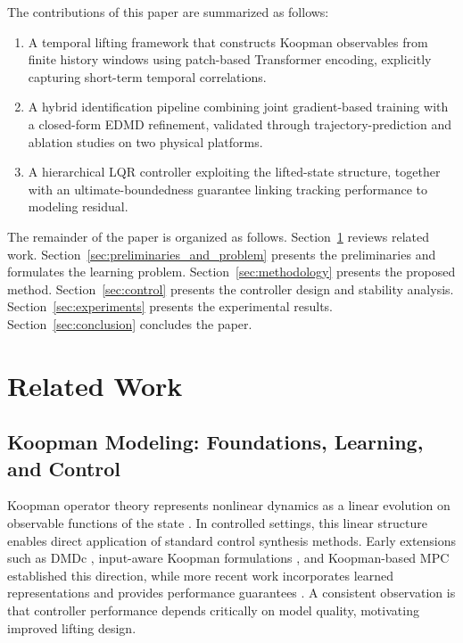 \documentclass[journal]{IEEEtran}
\begin{document}
The contributions of this paper are summarized as follows:
\begin{enumerate}
    \item A temporal lifting framework that constructs Koopman observables from finite history windows using patch-based Transformer encoding, explicitly capturing short-term temporal correlations.
    \item A hybrid identification pipeline combining joint gradient-based training with a closed-form EDMD refinement, validated through trajectory-prediction and ablation studies on two physical platforms.
    \item A hierarchical LQR controller exploiting the lifted-state structure, together with an ultimate-boundedness guarantee linking tracking performance to modeling residual.
\end{enumerate}

The remainder of the paper is organized as follows. Section~\ref{sec:related_work} reviews related work. Section~\ref{sec:preliminaries_and_problem} presents the preliminaries and formulates the learning problem. Section~\ref{sec:methodology} presents the proposed method. Section~\ref{sec:control} presents the controller design and stability analysis. Section~\ref{sec:experiments} presents the experimental results. Section~\ref{sec:conclusion} concludes the paper.

\section{Related Work}
\label{sec:related_work}

\subsection{Koopman Modeling: Foundations, Learning, and Control}

Koopman operator theory represents nonlinear dynamics as a linear evolution on observable functions of the state \cite{koopman1931hamiltonian, koopman1932spectra, mezic2005spectral, rowley2009spectral}. In controlled settings, this linear structure enables direct application of standard control synthesis methods. Early extensions such as DMDc \cite{proctor2016dmdc}, input-aware Koopman formulations \cite{proctor2018generalizing, brunton2016invariant}, and Koopman-based MPC \cite{korda2018linear} established this direction, while more recent work incorporates learned representations and provides performance guarantees \cite{han2020deep, shi2022deep, strasser2026overview, duran2025control}. A consistent observation is that controller performance depends critically on model quality, motivating improved lifting design.
\end{document}
